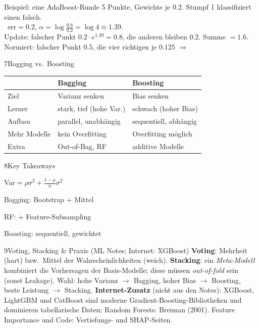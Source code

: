 \begin{hngrid}
%
\begin{hnex}[raster multicolumn=3]{Beispiel: eine AdaBoost-Runde}
5 Punkte, Gewichte je $0.2$. Stumpf 1 klassifiziert einen falsch.\\
\hnsol\ $\mathrm{err}=0.2$, $\alpha=\log\frac{0.8}{0.2}=\log4\approx1.39$.\\
Update: falscher Punkt $0.2\cdot e^{1.39}=0.8$, die anderen bleiben $0.2$. Summe $=1.6$.\\
Normiert: falscher Punkt $0.5$, die vier richtigen je $0.125$ $\Rightarrow$ 
\end{hnex}
%
\begin{hnp}[raster multicolumn=4,acc=hnpurple]{7}{Bagging vs.\ Boosting}
\renewcommand{\arraystretch}{1.25}
\begin{tabular}{@{}p{2.4cm}p{4.2cm}p{4.3cm}@{}}
\hline
&\textbf{Bagging}&\textbf{Boosting}\\\hline
Ziel&Varianz senken&Bias senken\\
Lerner&stark, tief (hohe Var.)&schwach (hoher Bias)\\
Aufbau&parallel, unabhängig&sequentiell, abhängig\\
Mehr Modelle&kein Overfitting&Overfitting möglich\\
Extra&Out-of-Bag, RF&additive Modelle\\\hline
\end{tabular}
\end{hnp}
%
\begin{hnp}[raster multicolumn=2,acc=hnorange]{8}{Key Takeaways}
\begin{hnchk}
\item Var$=\rho\sigma^2+\frac{1-\rho}n\sigma^2$
\item Bagging: Bootstrap + Mittel
\item RF: + Feature-Subsampling
\item Boosting: sequentiell, gewichtet
\end{hnchk}
\end{hnp}
%
\begin{hnp}[raster multicolumn=6,acc=hnteal]{9}{Voting, Stacking \& Praxis (ML Notes; Internet: XGBoost)}
\textbf{Voting}: Mehrheit (hart) bzw.\ Mittel der Wahrscheinlichkeiten (weich). \textbf{Stacking}: ein \emph{Meta-Modell} kombiniert die Vorhersagen der Basis-Modelle; diese müssen \emph{out-of-fold} sein (sonst Leakage). Wahl: hohe Varianz $\to$ Bagging, hoher Bias $\to$ Boosting, beste Leistung $\to$ Stacking. \textbf{Internet-Zusatz} (nicht aus den Notes): XGBoost, LightGBM und CatBoost sind moderne Gradient-Boosting-Bibliotheken und dominieren tabellarische Daten; Random Forests: Breiman (2001). Feature Importance und Code: Vertiefungs- und SHAP-Seiten.

\end{hnp}
\end{hngrid}
